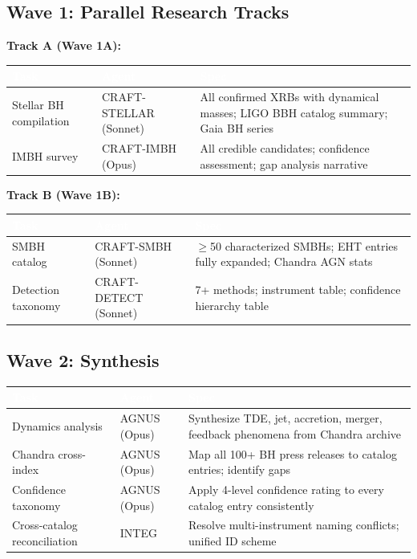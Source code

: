 \documentclass[11pt,letterpaper]{article}
\newcommand{\tableheader}[1]{\textbf{\sffamily\textcolor{white}{#1}}}
\begin{document}
\subsection{Wave 1: Parallel Research Tracks}

\textbf{Track A (Wave 1A):}

\begin{center}
\begin{tabularx}{\textwidth}{L{3cm}L{2.5cm}X}
\toprule
{}
\tableheader{Task} & \tableheader{Agent} & \tableheader{Spec} \\
\midrule
Stellar BH compilation & CRAFT-STELLAR (Sonnet) & All confirmed XRBs with dynamical masses; LIGO BBH catalog summary; Gaia BH series \\
IMBH survey & CRAFT-IMBH (Opus) & All credible candidates; confidence assessment; gap analysis narrative \\
\bottomrule
\end{tabularx}
\end{center}

\textbf{Track B (Wave 1B):}

\begin{center}
\begin{tabularx}{\textwidth}{L{3cm}L{2.5cm}X}
\toprule
{}
\tableheader{Task} & \tableheader{Agent} & \tableheader{Spec} \\
\midrule
SMBH catalog & CRAFT-SMBH (Sonnet) & $\geq$50 characterized SMBHs; EHT entries fully expanded; Chandra AGN stats \\
Detection taxonomy & CRAFT-DETECT (Sonnet) & 7+ methods; instrument table; confidence hierarchy table \\
\bottomrule
\end{tabularx}
\end{center}

\subsection{Wave 2: Synthesis}

\begin{center}
\begin{tabularx}{\textwidth}{L{3.5cm}L{2.5cm}X}
\toprule
{}
\tableheader{Task} & \tableheader{Agent} & \tableheader{Spec} \\
\midrule
Dynamics analysis & AGNUS (Opus) & Synthesize TDE, jet, accretion, merger, feedback phenomena from Chandra archive \\
Chandra cross-index & AGNUS (Opus) & Map all 100+ BH press releases to catalog entries; identify gaps \\
Confidence taxonomy & AGNUS (Opus) & Apply 4-level confidence rating to every catalog entry consistently \\
Cross-catalog reconciliation & INTEG & Resolve multi-instrument naming conflicts; unified ID scheme \\
\bottomrule
\end{tabularx}
\end{center}
\end{document}
